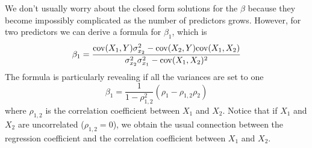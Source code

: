  
We don't usually worry about the closed form solutions for the $\beta$ because they become impossibly complicated as the number of predictors grows. However, for two predictors we can derive a formula for $\beta_1$, which is 
\begin{align}\label{eq:beta1cov}
\beta_1 =     \frac{ {\rm cov}(X_1,Y)\sigma_{x_2}^2 - {\rm cov}(X_2,Y){\rm cov}(X_1,X_2)}{\sigma_{x_2}^2\sigma_{x_1}^2 -{\rm cov}(X_1,X_2)^2}
\end{align}
The formula is particularly revealing if all the variances are set to one
\begin{equation*}
\beta_1 = \frac{1}{1-\rho_{1,2}^2}(\rho_1 - \rho_{1,2}\rho_2)
\end{equation*}
where $\rho_{1,2}$ is the correlation coefficient between $X_1$ and $X_2$. Notice that if $X_1$ and $X_2$ are uncorrelated ($\rho_{1,2}=0$), we obtain the usual connection between the regression coefficient and the correlation coefficient between $X_1$ and $X_2$. 

